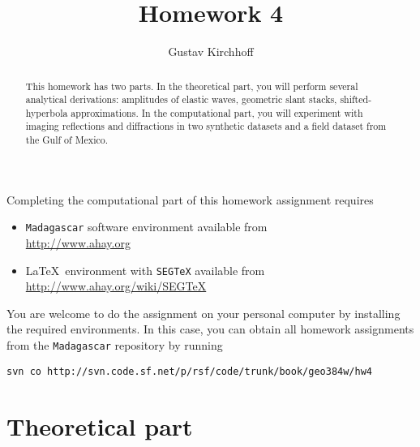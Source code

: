 \author{Gustav Kirchhoff} 
\title{Homework 4}

\begin{abstract}
  This homework has two parts. In the theoretical part, you will
  perform several analytical derivations: amplitudes of elastic waves,
  geometric slant stacks, shifted-hyperbola approximations. In the
  computational part, you will experiment with imaging reflections and
  diffractions in two synthetic datasets and a field dataset from the
  Gulf of Mexico.
\end{abstract}

Completing the computational part of this homework assignment requires
\begin{itemize}
\item \texttt{Madagascar} software environment available from \\
  \url{http://www.ahay.org}
\item \LaTeX\ environment with \texttt{SEGTeX} available from \\ 
  \url{http://www.ahay.org/wiki/SEGTeX}
\end{itemize}

You are welcome to do the assignment on your personal computer by
installing the required environments. In this case, you can obtain all
homework assignments from the \texttt{Madagascar} repository by running
\begin{verbatim}
svn co http://svn.code.sf.net/p/rsf/code/trunk/book/geo384w/hw4
\end{verbatim}

\section{Theoretical part}

